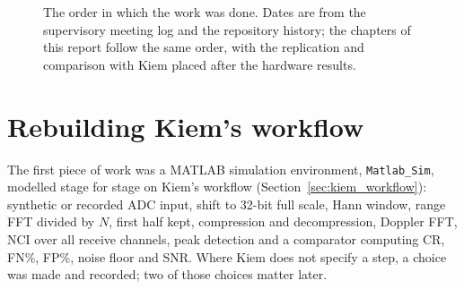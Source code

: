\begin{figure}[htbp]
\centering
{}
\caption[Project timeline]{The order in which the work was done. Dates are
from the supervisory meeting log and the repository history; the chapters of
this report follow the same order, with the replication and comparison with
Kiem placed after the hardware results.}
\label{fig:timeline}
\end{figure}

\section{Rebuilding Kiem's workflow}
\label{sec:jr_rebuild}

The first piece of work was a MATLAB simulation environment,
\texttt{Matlab\_Sim}, modelled stage for stage on Kiem's workflow
(Section~\ref{sec:kiem_workflow}): synthetic or recorded ADC input, shift to
32-bit full scale, Hann window, range FFT divided by $N$, first half kept,
compression and decompression, Doppler FFT, NCI over all receive channels,
peak detection and a comparator computing CR, FN\%, FP\%, noise floor and SNR.
Where Kiem does not specify a step, a choice was made and recorded; two of those
choices matter later.

